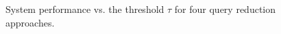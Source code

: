 %
%
\begin{figure}[t!]
\begin{centering}
\par\end{centering}

\begin{centering}
\par\end{centering}

\protect\caption{System performance vs. the threshold $\tau$ for four query reduction approaches.}
\label{fig:queryreduc}
\end{figure}


